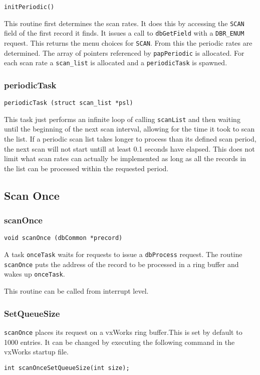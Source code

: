 \begin{verbatim}initPeriodic()
\end{verbatim}This routine first determines the scan rates. It does this by accessing the \verb|SCAN| field of the first record it finds. It issues a 
call to \verb|dbGetField| with a \verb|DBR_ENUM| request. This returns the menu choices for \verb|SCAN|. From this the periodic rates are 
determined. The array of pointers referenced by \verb|papPeriodic| is allocated. For each scan rate a \verb|scan_list| is 
allocated and a \verb|periodicTask| is spawned.

\subsubsection{periodicTask}

\begin{verbatim}periodicTask (struct scan_list *psl)
\end{verbatim}This task just performs an infinite loop of calling \verb|scanList| and then waiting until the beginning of the next scan 
interval, allowing for the time it took to scan the list. If a periodic scan list takes longer to process than its defined scan 
period, the next scan will not start untill at least 0.1 seconds have elapsed.  This does not limit what scan rates can actually 
be implemented as long as all the records in the list can be processed within the requested period.

\subsection{Scan Once}

\subsubsection{scanOnce}

\begin{verbatim}void scanOnce (dbCommon *precord)
\end{verbatim}A task \verb|onceTask| waits for requests to issue a \verb|dbProcess| request. The routine \verb|scanOnce| puts the address of the 
record to be processed in a ring buffer and wakes up \verb|onceTask|.

This routine can be called from interrupt level.

\subsubsection{SetQueueSize}

\verb|scanOnce| places its request on a vxWorks ring buffer.This is set by default to 1000 entries. It can be changed by 
executing the following command in the vxWorks startup file.

\begin{verbatim}int scanOnceSetQueueSize(int size);
\end{verbatim}










